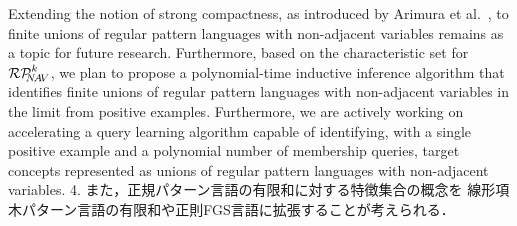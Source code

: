 Extending the notion of strong compactness, as introduced by Arimura et al.~\cite{Arimura1996}, to finite unions of regular pattern languages with non-adjacent variables remains as a topic for future research.
Furthermore, based on the characteristic set for $\mathcal{RP}^{k}_{\!\!\!N\!A\!V}$, we plan to propose a polynomial-time inductive inference algorithm that identifies finite unions of regular pattern languages with non-adjacent variables in the limit from positive examples.
Furthermore, we are actively working on accelerating a query learning algorithm capable of identifying, with a single positive example and a polynomial number of membership queries, target concepts represented as unions of regular pattern languages with non-adjacent variables.
{\color{green} 4. また，正規パターン言語の有限和に対する特徴集合の概念を
線形項木パターン言語\cite{Suzuki2006}の有限和や正則FGS言語\cite{Uchida1994}に拡張することが考えられる．}

